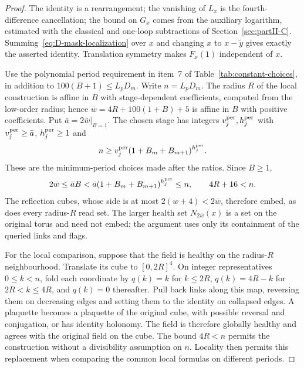 \begin{proof}
The identity is a rearrangement; the vanishing of $L_x$ is the fourth-difference cancellation; the bound on $G_x$ comes from the auxiliary logarithm, estimated with the classical and one-loop subtractions of Section~\ref{sec:partII-C}. Summing~\eqref{eq:D-mask-localization} over $x$ and changing $x$ to $x-\widetilde y$ gives exactly the asserted identity. Translation symmetry makes $F_x(1)$ independent of $x$.

Use the polynomial period requirement in item~7 of Table~\ref{tab:constant-choices}, in addition to $100(B+1)\le L_pD_m$. Write $n=L_pD_m$. The radius $R$ of the local construction is affine in $B$ with stage-dependent coefficients, computed from the low-order radius; hence $\bar w=4R+100(1+B)+5$ is affine in $B$ with positive coefficients. Put $\bar a=2\bar w|_{B=1}$. The chosen stage has integers $v_j^{\rm per},h_j^{\rm per}$ with $v_j^{\rm per}\ge\bar a$, $h_j^{\rm per}\ge1$ and
\begin{equation*}
n\ge v_j^{\rm per}(1+B_m+B_{m+1})^{h_j^{\rm per}}.
\end{equation*}
These are the minimum-period choices made after the ratios. Since $B\ge1$,
\begin{equation*}
2\bar w\le\bar aB<\bar a(1+B_m+B_{m+1})^{h_j^{\rm per}}\le n,
\qquad 4R+16<n.
\end{equation*}
The reflection cubes, whose side is at most $2(w+4)<2\bar w$, therefore embed, as does every radius-$R$ read set. The larger health set $N_{2\bar w}(x)$ is a set on the original torus and need not embed; the argument uses only its containment of the queried links and flags.

For the local comparison, suppose that the field is healthy on the radius-$R$ neighbourhood. Translate its cube to $[0,2R]^4$. On integer representatives $0\le k<n$, fold each coordinate by $q(k)=k$ for $k\le2R$, $q(k)=4R-k$ for $2R<k\le4R$, and $q(k)=0$ thereafter. Pull back links along this map, reversing them on decreasing edges and setting them to the identity on collapsed edges. A plaquette becomes a plaquette of the original cube, with possible reversal and conjugation, or has identity holonomy. The field is therefore globally healthy and agrees with the original field on the cube. The bound $4R<n$ permits the construction without a divisibility assumption on $n$. Locality then permits this replacement when comparing the common local formulas on different periods.


\end{proof}
